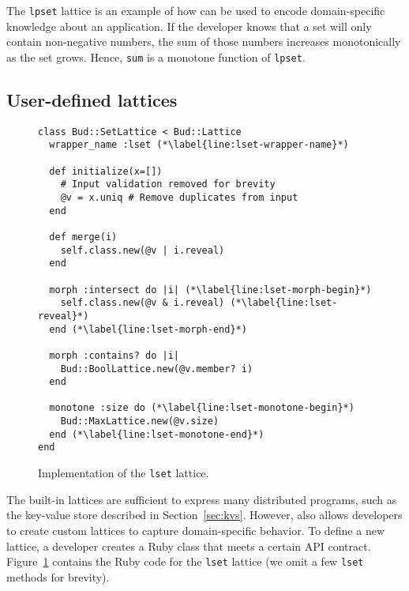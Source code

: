 The \texttt{lpset} lattice is an example of how \lang can be used to encode
domain-specific knowledge about an application. If the developer knows that a
set will only contain non-negative numbers, the sum of those numbers increases
monotonically as the set grows. Hence, \texttt{sum} is a monotone function of
\texttt{lpset}.%

\subsection{User-defined lattices}
\begin{figure}[t]
\begin{scriptsize}
\begin{lstlisting}[deletekeywords={lset}]
class Bud::SetLattice < Bud::Lattice
  wrapper_name :lset (*\label{line:lset-wrapper-name}*)

  def initialize(x=[])
    # Input validation removed for brevity
    @v = x.uniq # Remove duplicates from input
  end

  def merge(i)
    self.class.new(@v | i.reveal)
  end

  morph :intersect do |i| (*\label{line:lset-morph-begin}*)
    self.class.new(@v & i.reveal) (*\label{line:lset-reveal}*)
  end (*\label{line:lset-morph-end}*)

  morph :contains? do |i|
    Bud::BoolLattice.new(@v.member? i)
  end

  monotone :size do (*\label{line:lset-monotone-begin}*)
    Bud::MaxLattice.new(@v.size)
  end (*\label{line:lset-monotone-end}*)
end
\end{lstlisting}
\end{scriptsize}
\caption{Implementation of the \texttt{lset} lattice.}
\label{fig:lattice-lset}
\end{figure}

\label{sec:lattice-api}
The built-in lattices are sufficient to express many distributed programs, such
as the key-value store described in Section~\ref{sec:kvs}. However, \lang also
allows developers to create custom lattices to capture domain-specific
behavior. To define a new lattice, a developer creates a Ruby class that meets a
certain API contract. Figure~\ref{fig:lattice-lset} contains the Ruby code for
the \texttt{lset} lattice (we omit a few \texttt{lset} methods for
brevity).

